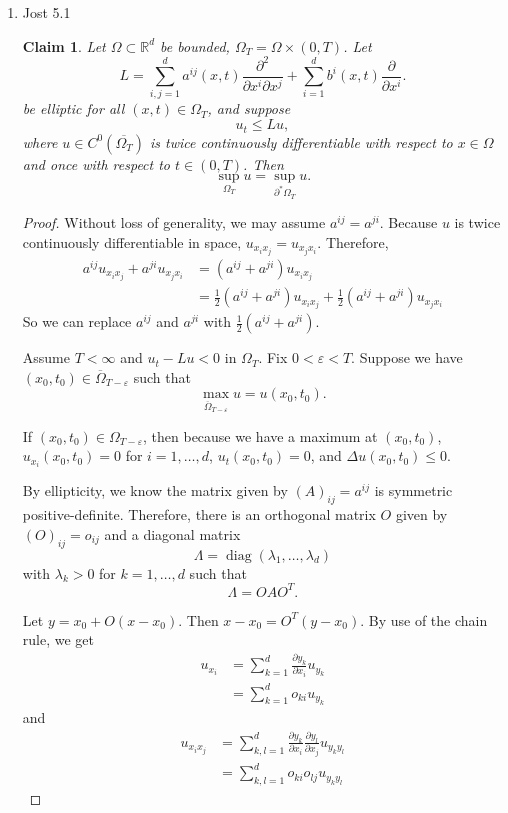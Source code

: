 \documentclass[a4paper]{article}
\newtheorem*{claim}{Claim}
\newcommand{\R}{\mathbb{R}}
\begin{document}
\begin{enumerate}
\begin{proof}
      Let $v = \Lambda(x,y,T+\varepsilon, t) - \mu$ for some $\varepsilon>0$. Then $v_t + \Delta v = 0$.
    \end{proof}

  \item Jost 5.1
    \begin{claim}
      Let $\Omega \subset \R^d$ be bounded, $\Omega_T = \Omega \times (0,T)$. Let
      \[ L = \sum_{i,j=1}^d a^{ij}(x,t) \frac{\partial^2}{\partial x^i \partial x^j} + \sum_{i=1}^d b^i(x,t) \frac{\partial}{\partial x^i} .\]
      be elliptic for all $(x,t) \in \Omega_T$, and suppose
      \[ u_t \leq Lu, \]
      where $u \in C^0(\overline{\Omega_T})$ is twice continuously differentiable with respect to $x \in \Omega$ and once with respect to $t \in
      (0,T)$. Then
      \[ \sup_{\Omega_T} u = \sup_{\partial^\ast \Omega_T} u. \]
    \end{claim}

    \begin{proof}
      Without loss of generality, we may assume $a^{ij} = a^{ji}$. Because $u$ is twice continuously differentiable in space, $u_{x_i x_j} = u_{x_j
      x_i}$. Therefore,
      \begin{align*}
        a^{ij} u_{x_i x_j} + a^{ji} u_{x_j x_i} &= (a^{ij} + a^{ji}) u_{x_i x_j} \\
        &= \frac{1}{2} (a^{ij} + a^{ji}) u_{x_i x_j} + \frac{1}{2} (a^{ij} + a^{ji}) u_{x_j x_i}
      \end{align*}
      So we can replace $a^{ij}$ and $a^{ji}$ with $\frac{1}{2} (a^{ij} + a^{ji})$.

      Assume $T < \infty$ and $u_t - Lu < 0$ in $\Omega_T$.
      Fix $0<\varepsilon<T$. Suppose we have $(x_0,t_0) \in \overline{\Omega}_{T-\varepsilon}$ such that
      \[ \max_{\overline{\Omega}_{T-\varepsilon}} u = u(x_0,t_0) .\]

      If $(x_0, t_0) \in \Omega_{T-\varepsilon}$, then because we have a maximum at $(x_0, t_0)$, $u_{x_i}(x_0,t_0) = 0$ for $i = 1, \dots, d$, $u_t(x_0,t_0) = 0$, and $\Delta u(x_0,t_0) \leq 0$.

      By ellipticity, we know the matrix given by $(A)_{ij} = a^{ij}$ is symmetric positive-definite. Therefore, there is an orthogonal matrix $O$
      given by $(O)_{ij} = o_{ij}$ and
      a diagonal matrix
      \[ \Lambda = \mathop{diag} (\lambda_1, \dots, \lambda_d) \]
      with $\lambda_k > 0$ for $k = 1, \dots, d$ such that
      \[ \Lambda = O A O^T .\]

      Let $y = x_0 + O(x - x_0)$. Then $x-x_0 = O^T(y-x_0)$. By use of the chain rule, we get
      \begin{align*}
        u_{x_i} &= \sum_{k=1}^d \frac{\partial y_k}{\partial x_i} u_{y_k} \\
        &= \sum_{k=1}^d o_{ki} u_{y_k}
     \end{align*}
     and
     \begin{align*}
       u_{x_i x_j} &= \sum_{k,l=1}^d \frac{\partial y_k}{\partial x_i} \frac{\partial y_l}{\partial x_j} u_{y_k y_l} \\
       &= \sum_{k,l=1}^d o_{ki} o_{lj} u_{y_k y_l}
     \end{align*}


\end{proof}
\end{enumerate}
\end{document}
